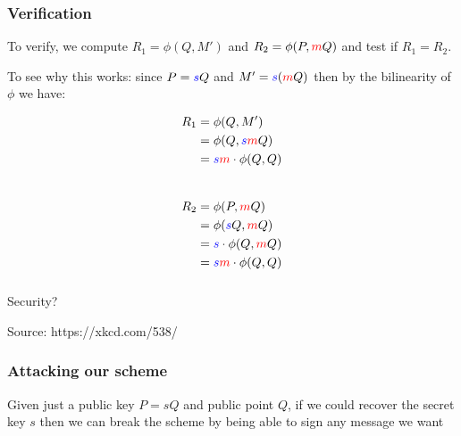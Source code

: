 \documentclass{beamer} %
\theoremstyle{definition} %
\begin{document}
\begin{frame}

\frametitle{Verification}

To verify, we compute $R_1 = \phi(Q, M')$ and $R_2 = \phi(P, \textcolor{red}{m}Q)$ and test if $R_1 = R_2$.  \pause 

To see why this works:  since $P = \textcolor{blue}{s}Q$ and $M' = \textcolor{blue}{s}(\textcolor{red}{m}Q)$ then by the bilinearity of $\phi$ we have:

\begin{center}
\begin{multicols}{2}
\noindent
\begin{align*}
R_1 &= \phi(Q,M')\\
&= \phi(Q,\textcolor{blue}{s}\textcolor{red}{m}Q)\\
&= \textcolor{blue}{s}\textcolor{red}{m}\cdot\phi(Q,Q)\\\\
\end{align*}

\pause

\begin{align*}
R_2 &= \phi(P, \textcolor{red}{m}Q)\\
&= \phi(\textcolor{blue}{s}Q, \textcolor{red}{m}Q)\\
&= \textcolor{blue}{s}\cdot\phi(Q,\textcolor{red}{m}Q)\\
&= \textcolor{blue}{s}\textcolor{red}{m}\cdot\phi(Q,Q)
\end{align*}
\end{multicols}
\end{center}
\end{frame}


\begin{frame}
\frametitle{\;}

\begin{center}
\Large{Security?}


\tiny{Source: https://xkcd.com/538/}
\end{center}

\end{frame}

\begin{frame}

\frametitle{Attacking our scheme}

Given just a public key $P = sQ$ and public point $Q$, if we could recover the secret key $s$ then we can break the scheme by being able to sign any message we want

\end{frame}
\end{document}
